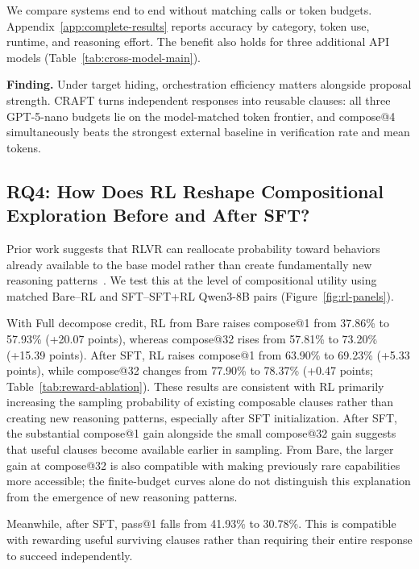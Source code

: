 We compare systems end to end without matching calls or token
budgets.  Appendix~\ref{app:complete-results} reports accuracy by category,
token use, runtime, and reasoning effort.  The benefit also holds for three
additional API models (Table~\ref{tab:cross-model-main}).

\begin{insightbox}
\textbf{Finding.}
Under target hiding, orchestration efficiency matters alongside proposal
strength.  CRAFT turns independent responses into reusable clauses: all three
GPT-5-nano budgets lie on the model-matched token frontier, and compose@4
simultaneously beats the strongest external baseline in verification rate and
mean tokens.
\end{insightbox}

\subsection{RQ4: How Does RL Reshape Compositional Exploration Before and After SFT?}
\label{sec:exp:rl}

Prior work suggests that RLVR can reallocate probability toward behaviors
already available to the base model rather than create fundamentally new
reasoning patterns~\citep{yue2025rlcapacity}.  We test this at the level of
compositional utility using matched Bare--RL and SFT--SFT+RL Qwen3-8B pairs
(Figure~\ref{fig:rl-panels}).

With Full decompose credit, RL from Bare raises compose@1 from
37.86\% to 57.93\% (+20.07 points), whereas compose@32 rises from
57.81\% to 73.20\% (+15.39 points).  After SFT, RL raises compose@1
from 63.90\% to 69.23\% (+5.33 points), while compose@32 changes from
77.90\% to 78.37\% (+0.47 points; Table~\ref{tab:reward-ablation}).
These results are consistent with RL primarily increasing the sampling
probability of existing composable clauses rather than creating new reasoning
patterns, especially after SFT initialization.  After SFT, the substantial
compose@1 gain alongside the small compose@32 gain suggests that useful
clauses become available earlier in sampling.  From Bare, the larger gain
at compose@32 is also compatible with making previously rare capabilities
more accessible; the finite-budget curves alone do not distinguish this
explanation from the emergence of new reasoning patterns.

Meanwhile, after SFT, pass@1 falls from 41.93\% to 30.78\%.
This is compatible with rewarding useful surviving clauses rather than
requiring their entire response to succeed independently.

